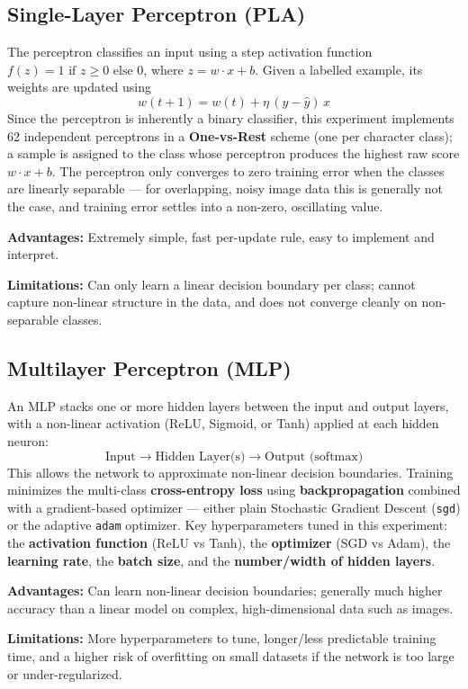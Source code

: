 \documentclass[12pt,a4paper]{article}
\begin{document}
\subsection{Single-Layer Perceptron (PLA)}
The perceptron classifies an input using a step activation function
$f(z) = 1 \text{ if } z \geq 0 \text{ else } 0$, where $z = w \cdot x + b$. Given a labelled
example, its weights are updated using
\[
w(t+1) = w(t) + \eta\,(y - \hat{y})\,x
\]
Since the perceptron is inherently a binary classifier, this experiment implements 62 independent
perceptrons in a \textbf{One-vs-Rest} scheme (one per character class); a sample is assigned to
the class whose perceptron produces the highest raw score $w \cdot x + b$. The perceptron only
converges to zero training error when the classes are linearly separable — for overlapping,
noisy image data this is generally not the case, and training error settles into a non-zero,
oscillating value.

\textbf{Advantages:} Extremely simple, fast per-update rule, easy to implement and interpret.

\textbf{Limitations:} Can only learn a linear decision boundary per class; cannot capture
non-linear structure in the data, and does not converge cleanly on non-separable classes.

\subsection{Multilayer Perceptron (MLP)}
An MLP stacks one or more hidden layers between the input and output layers, with a non-linear
activation (ReLU, Sigmoid, or Tanh) applied at each hidden neuron:
\[
\text{Input} \rightarrow \text{Hidden Layer(s)} \rightarrow \text{Output (softmax)}
\]
This allows the network to approximate non-linear decision boundaries. Training minimizes the
multi-class \textbf{cross-entropy loss} using \textbf{backpropagation} combined with a
gradient-based optimizer — either plain Stochastic Gradient Descent (\texttt{sgd}) or the
adaptive \texttt{adam} optimizer. Key hyperparameters tuned in this experiment: the
\textbf{activation function} (ReLU vs Tanh), the \textbf{optimizer} (SGD vs Adam), the
\textbf{learning rate}, the \textbf{batch size}, and the \textbf{number/width of hidden layers}.

\textbf{Advantages:} Can learn non-linear decision boundaries; generally much higher accuracy
than a linear model on complex, high-dimensional data such as images.

\textbf{Limitations:} More hyperparameters to tune, longer/less predictable training time, and a
higher risk of overfitting on small datasets if the network is too large or under-regularized.
\end{document}
